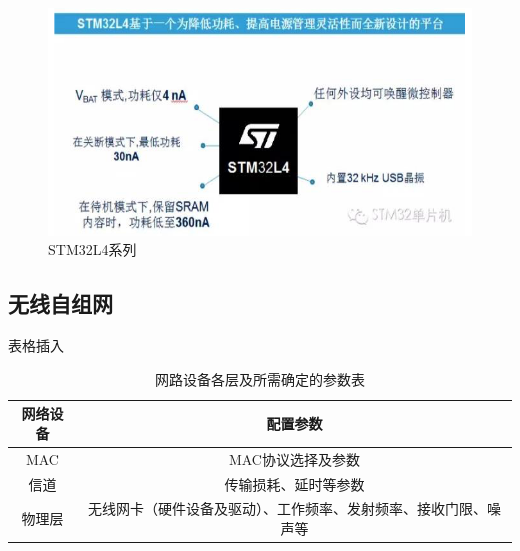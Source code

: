\documentclass[UTF8，a4paper]{ctexrep}
\begin{document}
  \begin{figure}[ht]
  \centering
  \includegraphics[width=15cm]{Picture/图2-1STM32L4系列.png}
  \caption{STM32L4系列}
  \label{fig:STM32L4系列}
  \end{figure}


  \subsection{无线自组网}
  表格插入

  \begin{table}[ht]
    \centering
    \caption{网路设备各层及所需确定的参数表}
    \begin{tabular}{c|c}
      \toprule
      网络设备  & 配置参数 \\
      \hline
      MAC     &   MAC协议选择及参数\\
      \hline
      信道    &    传输损耗、延时等参数\\
      \hline
      物理层    &   无线网卡（硬件设备及驱动）、工作频率、发射频率、接收门限、噪声等\\
      \bottomrule
    \end{tabular}
  \end{table}
  
\end{document}
